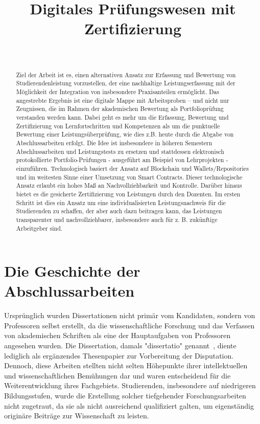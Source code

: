 \documentclass[conference]{IEEEtran}
\title{Digitales Prüfungswesen mit Zertifizierung}
\author{
    \IEEEauthorblockN{Martin Becke\IEEEauthorrefmark{1}\textsuperscript{\textdagger}, Julia Padberg\IEEEauthorrefmark{1}\textsuperscript{\textasteriskcentered}}\\
    \IEEEauthorblockA{\IEEEauthorrefmark{1} NahLab! HAW Hamburg\\
    \textsuperscript{\textdagger}Martin.Becke@haw-hamburg.de, \textsuperscript{\textasteriskcentered}Julia.Padberg@haw-hamburg.de}
}
\date{}
\begin{document}
\maketitle

\begin{abstract}
Ziel der Arbeit ist es, einen alternativen Ansatz zur Erfassung und Bewertung von Studierendenleistung vorzustellen, der eine nachhaltige Leistungserfassung mit der Möglichkeit der Integration von insbesondere Praxisanteilen ermöglicht. Das angestrebte Ergebnis ist eine digitale Mappe mit Arbeitsproben -- und nicht nur Zeugnissen, die im Rahmen der akademischen Bewertung als Portfolioprüfung verstanden werden kann. Dabei geht es mehr um die Erfassung, Bewertung und Zertifizierung von Lernfortschritten und Kompetenzen als um die punktuelle Bewertung einer Leistungsüberprüfung, wie dies  z.B. heute durch die Abgabe von Abschlussarbeiten erfolgt. 
Die Idee ist insbesondere in höheren Semestern Abschlussarbeiten und Leistungstests zu ersetzen und stattdessen elektronisch protokollierte Portfolio-Prüfungen - ausgeführt am Beispiel von Lehrprojekten - einzuführen. Technologisch basiert der Ansatz auf Blockchain und Wallets/Repositories und im weitesten Sinne einer Umsetzung von Smart Contracts. Dieser technologische Ansatz erlaubt ein hohes Maß an Nachvollziehbarkeit und Kontrolle. Darüber hinaus bietet es die gesicherte Zertifizierung von Leistungen durch den Dozenten. Im ersten Schritt ist dies ein Ansatz um eine individualisierten Leistungsnachweis für die Studierenden zu schaffen, der aber auch dazu beitragen kann, das Leistungen transparenter und nachvollziehbarer, insbesondere auch für z. B. zukünftige Arbeitgeber sind.
\end{abstract}

\section{Die Geschichte der Abschlussarbeiten}

Ursprünglich wurden Dissertationen nicht primär vom Kandidaten, sondern von Professoren selbst erstellt, da die wissenschaftliche Forschung und das Verfassen von akademischen Schriften als eine der Hauptaufgaben von Professoren angesehen wurden. Die Dissertation, damals "dissertatio" genannt~\cite{Blair}, diente lediglich als ergänzendes Thesenpapier zur Vorbereitung der Disputation. Dennoch, diese Arbeiten stellten nicht selten Höhepunkte ihrer intellektuellen und wissenschaftlichen Bemühungen dar und waren entscheidend für die Weiterentwicklung ihres Fachgebiets. Studierenden, insbesondere auf niedrigeren Bildungsstufen, wurde die Erstellung solcher tiefgehender Forschungsarbeiten nicht zugetraut, da sie als nicht ausreichend qualifiziert galten, um eigenständig originäre Beiträge zur Wissenschaft zu leisten.~\cite{Schmidt-Kunsemuller1979-vd}
\end{document}
